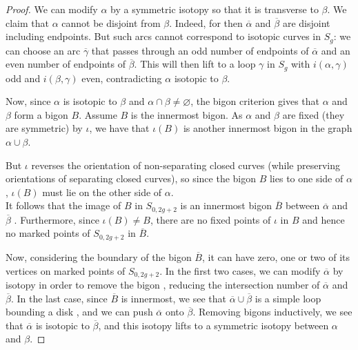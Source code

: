 \documentclass[reqno]{amsart}
\theoremstyle{definition}
\theoremstyle{remark}
\begin{document}
\begin{proof}
       We can modify $\alpha$ by a symmetric
       isotopy so that it is transverse to $\beta$.
       We claim that $\alpha$ cannot be
       disjoint from $\beta$. Indeed,
       for then $\overline{\alpha}$ and $\overline{\beta}$ 
       are disjoint including endpoints. But
       such arcs cannot correspond
       to isotopic curves in $S_g$: we can choose
       an arc $\overline{\gamma}$ that passes through
        an odd number of endpoints of
        $\overline{\alpha}$ and
        an even number of endpoints of $\overline{\beta}$.
        This will then lift to a loop
        $\gamma$ in $S_g$ with
        $i \left( \alpha, \gamma \right) $ odd
        and $i \left( \beta, \gamma \right) $ even, contradicting
        $\alpha$ isotopic to $\beta$.

        Now, since $\alpha$ is isotopic to $\beta$ and
        $\alpha \cap \beta \neq \varnothing$, the bigon
        criterion gives that
        $\alpha$ and $\beta$ form a bigon $B$. Assume
        $B$ is the innermost bigon. As
        $\alpha$ and $\beta$ are fixed (they are symmetric) by
        $\iota$, we have that $\iota (B)$ is another
        innermost bigon in the graph
        $\alpha \cup \beta$.

        But $\iota$ reverses the orientation of non-separating
        closed curves (while preserving orientations
        of separating closed curves), so
        since the bigon $B$ lies to one side of $\alpha$,
        $\iota(B)$ must lie on the other side of $\alpha$.\\
        \linebreak
        It follows that the image of 
        $B$ in $S_{0,2g+2}$ is an innermost bigon $\overline{B}$ 
        between $\overline{\alpha}$ and $\overline{\beta}$ .
        Furthermore, since $\iota (B) \neq B$, there are
        no fixed points of $\iota$ in $B$ and hence
        no marked points of
        $S_{0,2g+2}$ in $\overline{B}$.

        Now, considering the boundary of the bigon $\overline{B}$,
        it can have zero, one or two of its vertices on
        marked points of $S_{0,2g+2}$. In the first two cases,
        we can modify $\overline{\alpha}$ by isotopy
        in order to remove the bigon , reducing the intersection
        number of $\overline{\alpha}$ and $\overline{\beta}$.
        In the last case, since $\overline{B}$ is innermost,
        we see that $\overline{\alpha} \cup 
        \overline{\beta}$ is a simple loop bounding
        a disk , and we can push $\overline{\alpha}$ onto
        $\overline{\beta}$. Removing bigons inductively,
        we see that $\overline{\alpha}$ is isotopic
        to $\overline{\beta}$, and this isotopy lifts to a
        symmetric isotopy between $\alpha$ and $\beta$.

   \end{proof}
\end{document}
